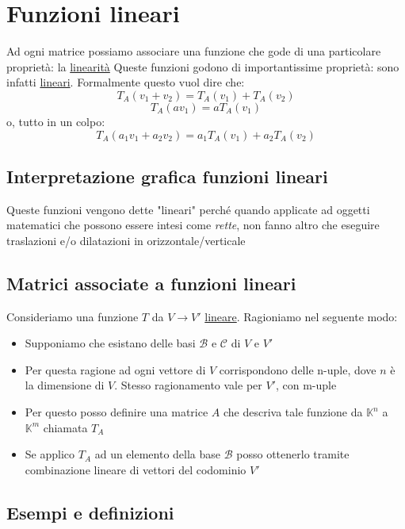 \documentclass[12pt,a4paper,oneside]{article}
\begin{document}
\section{Funzioni lineari}
Ad ogni matrice possiamo associare una funzione che gode di una particolare proprietà: la \underline{linearità}
Queste funzioni godono di importantissime proprietà: sono infatti \underline{lineari}. Formalmente questo vuol dire che:
\[
	T_A \left( v_1 + v_2 \right) = T_A \left( v_1 \right) + T_A \left( v_2 \right)
\]
\[
	T_A\left( av_1 \right) =a T_A\left( v_1 \right)
\]
o, tutto in un colpo:
\[
	T_A \left( a_1v_1 + a_2v_2 \right) =a_1 T_A \left( v_1 \right) +a_2 T_A \left( v_2 \right)
\]
\subsection{Interpretazione grafica funzioni lineari}
Queste funzioni vengono dette "lineari" perché quando applicate ad oggetti matematici che possono essere intesi come \textit{rette}, non fanno altro che eseguire traslazioni e/o dilatazioni in orizzontale/verticale
\subsection{Matrici associate a funzioni lineari}
Consideriamo una funzione $ T $ da $ V \to V' $ \underline{lineare}. Ragioniamo nel seguente modo:
\begin{itemize}
	\item Supponiamo che esistano delle basi $ \mathcal{B} $ e $ \mathcal{C} $ di $ V $ e $ V' $
	\item Per questa ragione ad ogni vettore di $ V $ corrispondono delle n-uple, dove $ n $ è la dimensione di $ V $. Stesso ragionamento vale per $ V' $, con m-uple
	\item Per questo posso definire una matrice $ A $ che descriva tale funzione da $ \mathbb{K}^{n} $  a $ \mathbb{K}^{m} $ chiamata $ T_A $
	\item Se applico $ T_A $ ad un elemento della base $ \mathcal{B} $ posso ottenerlo tramite combinazione lineare di vettori del codominio $ V' $
\end{itemize}
\subsection{Esempi e definizioni}
\end{document}
